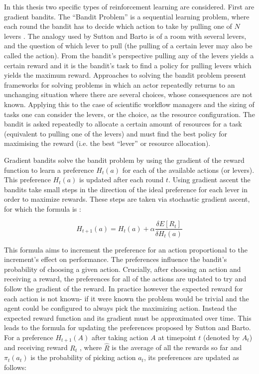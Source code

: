 In this thesis two specific types of reinforcement learning are considered. First are gradient bandits. The ``Bandit Problem'' is a sequential learning problem, where each round the bandit has to decide which action to take by pulling one of $N$ levers \cite{ding_efficient}. The analogy used by Sutton and Barto is of a room with several levers, and the question of which lever to pull (the pulling of a certain lever may also be called the action). From the bandit's perspective pulling any of the levers yields a certain reward and it is the bandit's task to find a policy for pulling levers which yields the maximum reward.  Approaches to solving the bandit problem present frameworks for solving problems in which an actor repeatedly returns to an unchanging situation where there are several choices, whose consequences are not known. Applying this to the case of scientific workflow managers and the sizing of tasks one can consider the levers, or the choice, as the resource configuration. The bandit is asked repeatedly to allocate a certain amount of resources for a task (equivalent to pulling one of the levers) and must find the best policy for maximising the reward (i.e. the best “lever” or resource allocation). 

Gradient bandits solve the bandit problem by using the gradient of the reward function to learn a preference $H_t(a)$ for each of the available actions (or levers). This preference $H_t(a)$ is updated after each round $t$. Using gradient ascent the bandits take small steps in the direction of the ideal preference for each lever in order to maximize rewards. These steps are taken via stochastic gradient ascent, for which the formula is : 

\begin{equation}\label{gradient_ascent}
H_{t+1}(a) = H_t(a) + \alpha \frac{ \delta E[R_t] }  {\delta H_t(a)}
\end{equation}

This formula aims to increment the preference for an action proportional to the increment's effect on performance. The preferences influence the bandit’s probability of choosing a given action. Crucially, after choosing an action and receiving a reward, the preferences for all of the actions are updated to try and follow the gradient of the reward. In practice however the expected reward for each action is not known- if it were known the problem would be trivial and the agent could be configured to always pick the maximizing action. Instead the expected reward function and its gradient must be approximated over time. This leads to the formula for updating the preferences proposed by Sutton and Barto. For a preference $H_{t+1}(A)$ after taking action $A$ at timepoint $t$ (denoted by $A_t$) and receiving reward $R_t$ , where $\hat{R}$ is the average of all the rewards so far and $\pi_t(a_t)$ is the probability of picking action $a_t$, its preferences are updated as follows: 

